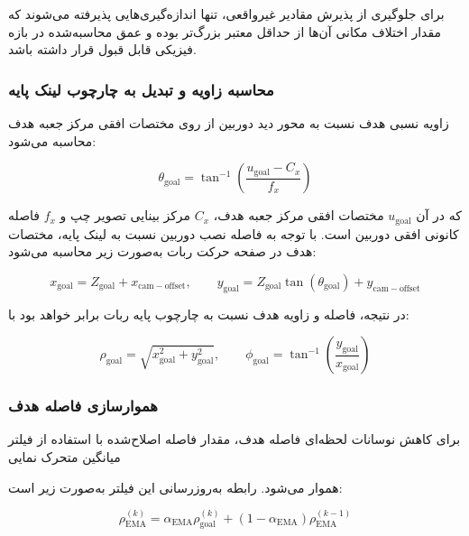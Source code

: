 برای جلوگیری از پذیرش مقادیر غیرواقعی، تنها اندازه‌گیری‌هایی پذیرفته می‌شوند که مقدار اختلاف مکانی آن‌ها از حداقل معتبر بزرگ‌تر بوده و عمق محاسبه‌شده در بازه فیزیکی قابل قبول قرار داشته باشد.

\subsubsection{محاسبه زاویه و تبدیل به چارچوب لینک پایه}

زاویه نسبی هدف نسبت به محور دید دوربین از روی مختصات افقی مرکز جعبه هدف محاسبه می‌شود:

\begin{equation}
	\theta_{\mathrm{goal}} =
	\tan^{-1}
	\left(
	\frac{u_{\mathrm{goal}}-C_x}{f_x}
	\right)
	\label{eq:goal_camera_bearing}
\end{equation}

که در آن \(u_{\mathrm{goal}}\) مختصات افقی مرکز جعبه هدف، \(C_x\) مرکز بینایی تصویر چپ و \(f_x\) فاصله کانونی افقی دوربین است. با توجه به فاصله نصب دوربین نسبت به لینک پایه، مختصات هدف در صفحه حرکت ربات به‌صورت زیر محاسبه می‌شود:

\begin{equation}
	x_{\mathrm{goal}} =
	Z_{\mathrm{goal}} + x_{\mathrm{cam-offset}},
	\qquad
	y_{\mathrm{goal}} =
	Z_{\mathrm{goal}}\tan(\theta_{\mathrm{goal}}) + y_{\mathrm{cam-offset}}
	\label{eq:goal_base_xy}
\end{equation}

در نتیجه، فاصله و زاویه هدف نسبت به چارچوب پایه ربات برابر خواهد بود با:

\begin{equation}
	\rho_{\mathrm{goal}} =
	\sqrt{x_{\mathrm{goal}}^2 + y_{\mathrm{goal}}^2},
	\qquad
	\phi_{\mathrm{goal}} =
	\tan^{-1}
	\left(
	\frac{y_{\mathrm{goal}}}{x_{\mathrm{goal}}}
	\right)
	\label{eq:goal_range_bearing_base}
\end{equation}

\subsubsection{هموارسازی فاصله هدف}

برای کاهش نوسانات لحظه‌ای فاصله هدف، مقدار فاصله اصلاح‌شده با استفاده از فیلتر میانگین متحرک نمایی%

هموار می‌شود. رابطه به‌روزرسانی این فیلتر به‌صورت زیر است:

\begin{equation}
	\rho_{\mathrm{EMA}}^{(k)}
	=
	\alpha_{\mathrm{EMA}}\rho_{\mathrm{goal}}^{(k)}
	+
	\left(1-\alpha_{\mathrm{EMA}}\right)
	\rho_{\mathrm{EMA}}^{(k-1)}
	\label{eq:goal_ema}
\end{equation}

